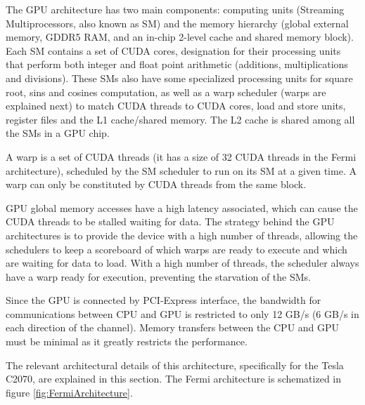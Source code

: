 The \nvidia GPU architecture has two main components: computing units (Streaming Multiprocessors, also known as SM) and the memory hierarchy (global external memory, GDDR5 RAM, and an in-chip 2-level cache and shared memory block). Each SM contains a set of CUDA cores, \nvidia designation for their processing units that perform both integer and float point arithmetic (additions, multiplications and divisions). These SMs also have some specialized processing units for square root, sins and cosines computation, as well as a warp scheduler (warps are explained next) to match CUDA threads to CUDA cores, load and store units, register files and the L1 cache/shared memory. The L2 cache is shared among all the SMs in a GPU chip.

A warp is a set of CUDA threads (it has a size of 32 CUDA threads in the Fermi architecture), scheduled by the SM scheduler to run on its SM at a given time. A warp can only be constituted by CUDA threads from the same block.

GPU global memory accesses have a high latency associated, which can cause the CUDA threads to be stalled waiting for data. The strategy behind the GPU architectures is to provide the device with a high number of threads, allowing the schedulers to keep a scoreboard of which warps are ready to execute and which are waiting for data to load. With a high number of threads, the scheduler always have a warp ready for execution, preventing the starvation of the SMs.

Since the GPU is connected by PCI-Express interface, the bandwidth for communications between CPU and GPU is restricted to only 12 GB/s (6 GB/s in each direction of the channel). Memory transfers between the CPU and GPU must be minimal as it greatly restricts the performance.

The relevant architectural details of this architecture, specifically for the Tesla C2070, are explained in this section. The Fermi architecture is schematized in figure \ref{fig:FermiArchitecture}.

